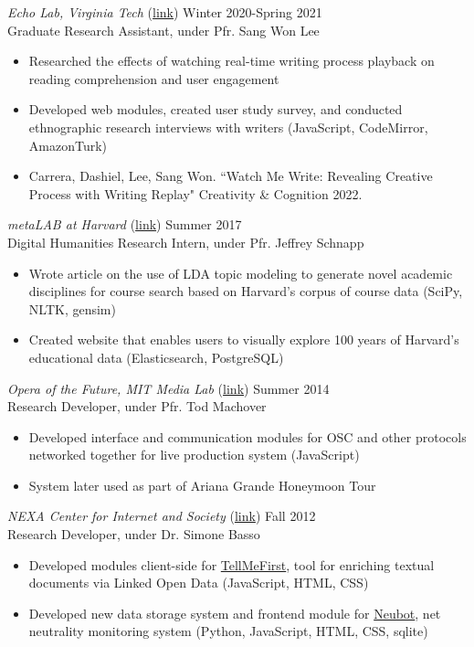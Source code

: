 {\sl Echo Lab, Virginia Tech }(\href{http://people.cs.vt.edu/sangwonlee/}{link})\hfill
Winter 2020-Spring 2021 \\
Graduate Research Assistant, under Pfr. Sang Won Lee \\
\begin{itemize} 
\item Researched the effects of watching real-time writing process playback on reading comprehension and user engagement
\item Developed web modules, created user study survey, and conducted ethnographic research interviews with writers (JavaScript, CodeMirror, AmazonTurk)
\item Carrera, Dashiel, Lee, Sang Won. ``Watch Me Write: Revealing Creative Process with Writing Replay" Creativity \& Cognition 2022.\\
\end{itemize} 

{\sl metaLAB at Harvard }(\href{http://metalabharvard.github.io/}{link})\hfill
Summer 2017 \\
Digital Humanities Research Intern, under Pfr. Jeffrey Schnapp  \\
\begin{itemize}
\item Wrote article on the use of LDA topic modeling to generate novel academic disciplines for course search based on Harvard's corpus of course data (SciPy, NLTK, gensim)
\item Created website that enables users to visually explore 100 years of Harvard's educational data (Elasticsearch, PostgreSQL)
\end{itemize}

{\sl Opera of the Future, MIT Media Lab} (\href{https://www.media.mit.edu/groups/opera-of-the-future/overview/}{link})
\hfill Summer 2014 \\
Research Developer, under Pfr. Tod Machover\\
\begin{itemize} \itemsep -2pt %
\item Developed interface and communication modules for OSC and other protocols networked together for live production system (JavaScript)
\item System later used as part of Ariana Grande Honeymoon Tour
\end{itemize}

{\sl NEXA Center for Internet and Society }(\href{http://nexa.polito.it}{link}) \hfill Fall 2012 \\
Research Developer, under Dr. Simone Basso  \\
\begin{itemize} 
\item Developed modules client-side for \href{http://tellmefirst.polito.it}{TellMeFirst}, tool for enriching textual documents via Linked Open Data (JavaScript, HTML, CSS)
\item Developed new data storage system and frontend module for \href{http://neubot.org}{Neubot}, net neutrality monitoring system (Python, JavaScript, HTML, CSS, sqlite)
\end{itemize} 

